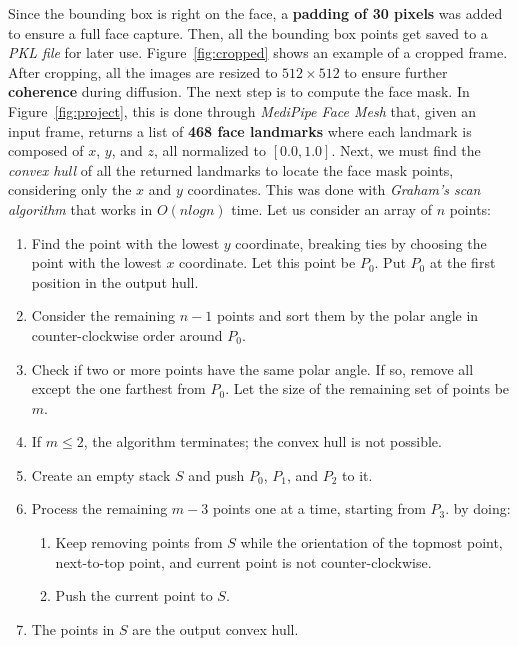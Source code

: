 \documentclass[preprint]{elsarticle}
\begin{document}
\FloatBarrier

Since the bounding box is right on the face, a \textbf{padding of 30 pixels} was added to ensure a full face capture. Then, all the bounding box points get saved to a \emph{PKL file} for later use.  Figure~\ref{fig:cropped} shows an example of a cropped frame. After cropping, all the images are resized to $512 \times 512$ to ensure further \textbf{coherence} during diffusion.  The next step is to compute the face mask.  In Figure~\ref{fig:project}, this is done through \emph{MediPipe Face Mesh} that, given an input frame, returns a list of \textbf{468 face landmarks}  where each landmark is composed of $x$, $y$, and $z$, all normalized to  $[0.0, 1.0]$.  Next, we must find the \emph{convex hull} of all the returned landmarks to locate the face mask points, considering only the $x$ and $y$ coordinates. 
This was done with \emph{Graham's scan algorithm} \cite{GRAHAM1972132} that works in $O(n log n)$ time. Let us consider an array of $n$ points:



\begin{enumerate}
	\item Find the point with the lowest $y$ coordinate, breaking ties by choosing the point with the lowest $x$ coordinate. 
	Let this point be $P_0$. Put $P_0$ at the first position in the output hull.
	\item Consider the remaining $n-1$ points and sort them by the polar angle in counter-clockwise order around $P_0$.
	\item Check if two or more points have the same polar angle. If so, remove all except the one farthest from $P_0$. 
	Let the size of the remaining set of points be $m$.
	\item If $m \leq 2$, the algorithm terminates; the convex hull is not possible.
	\item Create an empty stack $S$ and push $P_0$, $P_1$, and $P_2$ to it.
	\item Process the remaining $m-3$ points one at a time, starting from $P_3$. by doing:
	\begin{enumerate}
		\item Keep removing points from $S$ while the orientation of the topmost point, next-to-top point, and current point is not counter-clockwise.
		\item Push the current point to $S$.
	\end{enumerate}
	\item The points in $S$ are the output convex hull.
\end{enumerate}
\end{document}
